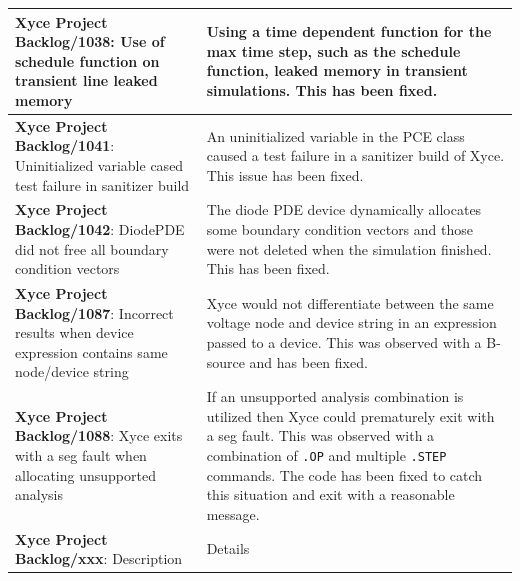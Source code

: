 {\begin{longtable}[h] {>{\raggedright\small}m{2in}|>{\raggedright\let\\\tabularnewline\small}m{3.5in}}
\textbf{Xyce Project Backlog/1038}: Use of schedule function on transient line leaked memory
  &  Using a time dependent function for the max time step, such as the schedule function,
  leaked memory in transient simulations.  This has been fixed.
  \\\hline

\textbf{Xyce Project Backlog/1041}: Uninitialized variable cased test failure in sanitizer build
  &  An uninitialized variable in the PCE class caused a test failure in a sanitizer build of Xyce.  
  This issue has been fixed.
  \\\hline
  
\textbf{Xyce Project Backlog/1042}: DiodePDE did not free all boundary condition vectors
  &  The diode PDE device dynamically allocates some boundary condition vectors and those
  were not deleted when the simulation finished.  This has been fixed.
  \\\hline

\textbf{Xyce Project Backlog/1087}: Incorrect results when device expression contains same node/device string
  &  Xyce would not differentiate between the same voltage node and device string in an expression passed to
     a device.  This was observed with a B-source and has been fixed.
  \\\hline

\textbf{Xyce Project Backlog/1088}: Xyce exits with a seg fault when allocating unsupported analysis
  &  If an unsupported analysis combination is utilized then Xyce could prematurely exit with a seg fault.
     This was observed with a combination of \texttt{.OP} and multiple \texttt{.STEP} commands.  The code
     has been fixed to catch this situation and exit with a reasonable message.
  \\\hline

\textbf{Xyce Project Backlog/xxx}: Description
  &  Details
  \\\hline


\end{longtable}
}
